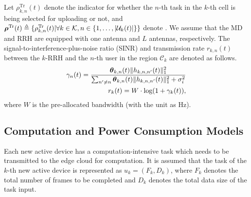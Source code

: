 Let $\rho^{\mathrm{Tr}}_{k, n}(t)$ denote the indicator for whether the $n$-th task in the $k$-th cell is being selected for uploading or not, and $\boldsymbol{\rho}^{\mathrm{Tr}}(t) \triangleq \{\rho^{\mathrm{Tr}}_{k, n}(t) | \forall k\in\mathcal{K},n\in\{1,\dots,|\mathcal{U}_{k}(t)|\}\}$ denote .
We assume that the MD and RRH are equipped with one antenna and $L$ antennas, respectively.
The signal-to-interference-plus-noise ratio (SINR) and transmission rate $r_{k,n}(t)$ between the $k$-RRH and the $n$-th user in the region $\mathcal{C}_{k}$ are denoted as follows.
\begin{align}
    \gamma_{n}(t) = \frac{
        \boldsymbol{\theta}_{k,n}(t) \lVert h_{k,n,n'}(t)\|_1^2
    }{
        \sum_{n' \neq n} \boldsymbol{\theta}_{k,n}(t) \lVert h_{k,n,n'}(t)\|_1^2 + \sigma_{i}^{2}
    }
    \\
    r_{k}(t)= W\cdot \text{log}(1+\gamma_{k}(t)),
\end{align}%
where $W$ is the pre-allocated bandwidth (with the unit as Hz).

\subsection{Computation and Power Consumption Models}
Each new active device has a computation-intensive task which needs to be transmitted to the edge cloud for computation. It is assumed that the task of the $k$-th new active device is represented as $u_{k}=(F_{k},D_{k})$, where $F_{k}$ denotes the total number of frames to be completed and $D_{k}$ denotes the total data size of the task input.

